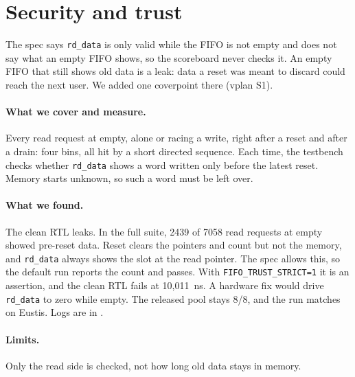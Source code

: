 \section{Security and trust}
\label{sec:security}

The spec says \texttt{rd\_data} is only valid while the FIFO is not empty and
does not say what an empty FIFO shows, so the scoreboard never checks it. An
empty FIFO that still shows old data is a leak: data a reset was meant to
discard could reach the next user. We added one coverpoint there (vplan S1).

\paragraph{What we cover and measure.} Every read request at empty, alone or
racing a write, right after a reset and after a drain: four bins, all hit by a
short directed sequence. Each time, the testbench checks whether
\texttt{rd\_data} shows a word written only before the latest reset. Memory
starts unknown, so such a word must be left over.

\paragraph{What we found.} The clean RTL leaks. In the full suite, 2439 of
7058 read requests at empty showed pre-reset data. Reset clears the pointers
and count but not the memory, and \texttt{rd\_data} always shows the slot at
the read pointer. The spec allows this, so the default run reports the count
and passes. With \texttt{FIFO\_TRUST\_STRICT=1} it is an assertion, and the
clean RTL fails at 10{,}011~ns. A hardware fix would drive \texttt{rd\_data}
to zero while empty. The released pool stays 8/8, and the run matches on
Eustis. Logs are in .

\paragraph{Limits.} Only the read side is checked, not how long old data stays
in memory.
